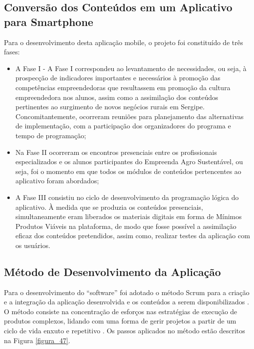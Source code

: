 \subsection{Conversão dos Conteúdos em um Aplicativo para Smartphone}

Para o desenvolvimento desta aplicação mobile, o projeto foi constituído de três fases: 

\begin{itemize}

\item{A Fase I - A Fase I correspondeu ao levantamento de necessidades, ou seja, à prospecção de indicadores importantes e necessários à promoção das competências empreendedoras que resultassem em promoção da cultura empreendedora nos alunos, assim como a assimilação dos conteúdos pertinentes ao surgimento de novos negócios rurais em Sergipe. Concomitantemente, ocorreram reuniões para planejamento das alternativas de implementação, com a participação dos organizadores do programa e tempo de programação;}

\item{Na Fase II ocorreram os encontros presenciais entre os profissionais especializados e os alunos participantes do Empreenda Agro Sustentável, ou seja, foi o momento em que todos os módulos de conteúdos pertencentes ao aplicativo foram abordados;}

\item{A Fase III consistiu no ciclo de desenvolvimento da programação lógica do aplicativo. À medida que se produzia os conteúdos presenciais, simultaneamente eram liberados os materiais digitais em forma de Mínimos Produtos Viáveis na plataforma, de modo que fosse possível a assimilação eficaz dos conteúdos pretendidos, assim como, realizar testes da aplicação com os usuários.}

\end{itemize}

\subsection{Método de Desenvolvimento da Aplicação}

Para o desenvolvimento do “software” foi adotado o método Scrum para a criação e a integração da aplicação desenvolvida e os conteúdos a serem disponibilizados \cite{schwalbe_scrum_2017}. O método consiste na concentração de esforços nas estratégias de execução de produtos complexos, lidando com uma forma de gerir projetos a partir de um ciclo de vida enxuto e repetitivo \cite{bernardo_framework_2019}. Os passos aplicados no método estão descritos na Figura \ref{figura_47}.

